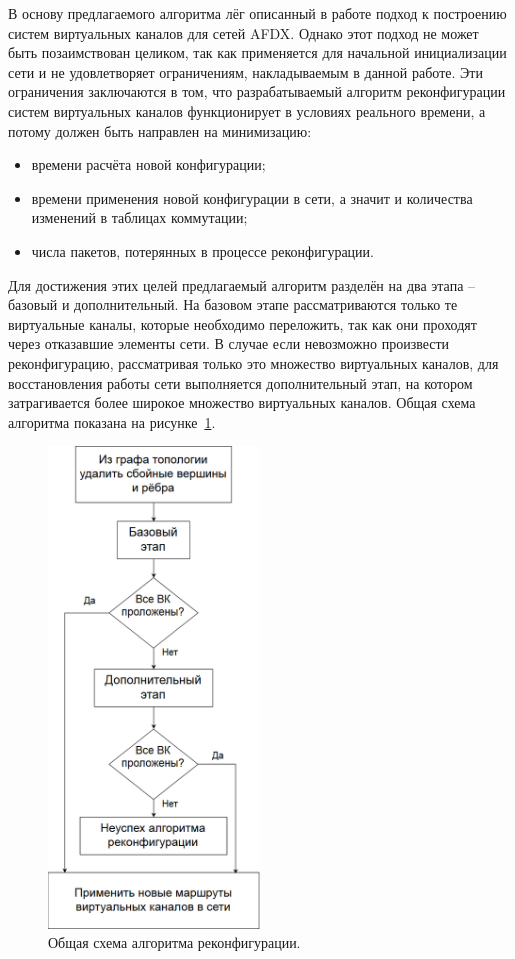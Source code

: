\documentclass[12pt, a4paper]{article}
\begin{document}
В основу предлагаемого алгоритма лёг описанный в работе \cite{vdovinalg} подход к построению систем виртуальных каналов для сетей AFDX. Однако этот подход не может быть позаимствован целиком, так как применяется для начальной инициализации сети и не удовлетворяет ограничениям, накладываемым в данной работе. Эти ограничения заключаются в том, что разрабатываемый алгоритм реконфигурации систем виртуальных каналов функционирует в условиях реального времени, а потому должен быть направлен на минимизацию:
\begin{itemize}
	\item времени расчёта новой конфигурации;
	\item времени применения новой конфигурации в сети, а значит и количества изменений в таблицах коммутации;
	\item числа пакетов, потерянных в процессе реконфигурации.
\end{itemize} 

Для достижения этих целей предлагаемый алгоритм разделён на два этапа -- базовый и дополнительный. На базовом этапе рассматриваются только те виртуальные каналы, которые необходимо переложить, так как они проходят через отказавшие элементы сети. В случае если невозможно произвести реконфигурацию, рассматривая только это множество виртуальных каналов, для восстановления работы сети выполняется дополнительный этап, на котором затрагивается более широкое множество виртуальных каналов. Общая схема алгоритма показана на рисунке~\ref{pic:algorithm}.

\begin{figure}[h!]
	\centering
	\includegraphics[width=0.50\textwidth]{img/alg.png}
	\caption{Общая схема алгоритма реконфигурации.}
	\label{pic:algorithm}
\end{figure}
\end{document}
